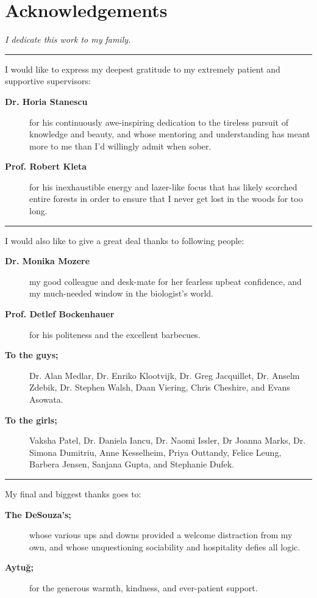 \chapter*{Acknowledgements}
\vfill
\emph{\large I dedicate this work to my family.}

\vfill\noindent\rule[0.5ex]{\linewidth}{1pt}\vfill
\noindent
I would like to express my deepest gratitude to my extremely patient and supportive supervisors:
\vspace{-8pt}
\begin{description}
\item[\bf Dr. Horia Stanescu]{for his continuously awe-inspiring dedication to the tireless pursuit of knowledge and beauty, and whose mentoring and understanding has meant more to me than I'd willingly admit when sober.}
\item[\bf Prof. Robert Kleta]{for his inexhaustible energy and lazer-like focus that has likely scorched entire forests in order to ensure that I never get lost in the woods for too long.}
\end{description}

\vfill\noindent\rule[0.5ex]{\linewidth}{1pt}\vfill
\noindent

\begin{spacing}{1.3}
\noindent
I would also like to give a great deal thanks to following people:
\vspace{-4pt}
\begin{description}
\item[\bf Dr. Monika Mozere]{my good colleague and desk-mate for her fearless upbeat confidence, and my much-needed window in the biologist's world.}
\item[\bf Prof. Detlef Bockenhauer]{for his politeness and the excellent barbecues.}
\item[\bf To the guys;]{Dr. Alan Medlar, Dr. Enriko Klootvijk, Dr. Greg Jacquillet, Dr. Anselm Zdebik, Dr. Stephen Walsh, Daan Viering, Chris Cheshire, and Evans Asowata.}
\item[\bf To the girls;]{Vaksha Patel, Dr. Daniela Iancu, Dr. Naomi Issler, Dr Joanna Marks, Dr. Simona Dumitriu, Anne Kesselheim, Priya Outtandy, Felice Leung, Barbera Jensen, Sanjana Gupta, and Stephanie Dufek.}
\end{description}

\vfill\noindent\rule[0.5ex]{\linewidth}{1pt}\vfill
\noindent
My final and biggest thanks goes to:\vspace{-4pt}
\begin{description}
\item[\bf The DeSouza's;]{whose various ups and downs provided a welcome distraction from my own, and whose unquestioning sociability and hospitality defies all logic.} 
\item[\bf Aytu\u{g};]{for the generous warmth, kindness, and ever-patient support.}
\end{description}
\end{spacing}
